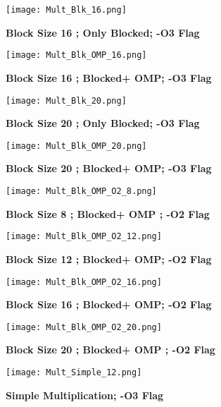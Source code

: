 \documentclass{article}
\begin{document}
\newpage

\begin{figure}[htpb!]
     \centering

    \texttt{[image: Mult\_Blk\_16.png]}
    \caption{ \textbf{Block Size 16 ; Only Blocked; -O3 Flag}}

        \texttt{[image: Mult\_Blk\_OMP\_16.png]}
    \caption{ \textbf{Block Size 16 ; Blocked+ OMP; -O3 Flag}}
  \end{figure} 

\newpage

\begin{figure}[htpb!]
     \centering

    \texttt{[image: Mult\_Blk\_20.png]}
    \caption{ \textbf{Block Size 20 ; Only Blocked; -O3 Flag}}

        \texttt{[image: Mult\_Blk\_OMP\_20.png]}
    \caption{ \textbf{Block Size 20 ; Blocked+ OMP; -O3 Flag}}
  \end{figure} 

\newpage

\begin{figure}[htpb!]
     \centering

    \texttt{[image: Mult\_Blk\_OMP\_O2\_8.png]}
    \caption{ \textbf{Block Size 8 ; Blocked+ OMP ; -O2 Flag}}

        \texttt{[image: Mult\_Blk\_OMP\_O2\_12.png]}
    \caption{ \textbf{Block Size 12 ; Blocked+ OMP; -O2 Flag}}
  \end{figure} 

\newpage

\begin{figure}[htpb!]
     \centering

    \texttt{[image: Mult\_Blk\_OMP\_O2\_16.png]}
    \caption{ \textbf{Block Size 16 ; Blocked+ OMP; -O2 Flag}}

        \texttt{[image: Mult\_Blk\_OMP\_O2\_20.png]}
    \caption{ \textbf{Block Size 20 ; Blocked+ OMP ; -O2 Flag}}
  \end{figure} 

\newpage
\begin{figure}[htpb!]
     \centering

    \texttt{[image: Mult\_Simple\_12.png]}
    \caption{ \textbf{Simple Multiplication; -O3 Flag}}
\end{figure}
\end{document}
